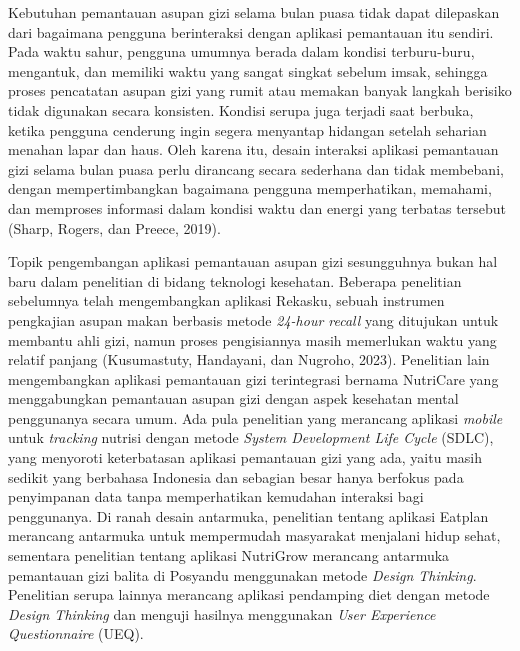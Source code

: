 Kebutuhan pemantauan asupan gizi selama bulan puasa tidak dapat dilepaskan dari bagaimana pengguna berinteraksi dengan aplikasi pemantauan itu sendiri. Pada waktu sahur, pengguna umumnya berada dalam kondisi terburu-buru, mengantuk, dan memiliki waktu yang sangat singkat sebelum imsak, sehingga proses pencatatan asupan gizi yang rumit atau memakan banyak langkah berisiko tidak digunakan secara konsisten. Kondisi serupa juga terjadi saat berbuka, ketika pengguna cenderung ingin segera menyantap hidangan setelah seharian menahan lapar dan haus. Oleh karena itu, desain interaksi aplikasi pemantauan gizi selama bulan puasa perlu dirancang secara sederhana dan tidak membebani, dengan mempertimbangkan bagaimana pengguna memperhatikan, memahami, dan memproses informasi dalam kondisi waktu dan energi yang terbatas tersebut (Sharp, Rogers, dan Preece, 2019).

Topik pengembangan aplikasi pemantauan asupan gizi sesungguhnya bukan hal baru dalam penelitian di bidang teknologi kesehatan. Beberapa penelitian sebelumnya telah mengembangkan aplikasi Rekasku, sebuah instrumen pengkajian asupan makan berbasis metode \emph{24-hour recall} yang ditujukan untuk membantu ahli gizi, namun proses pengisiannya masih memerlukan waktu yang relatif panjang (Kusumastuty, Handayani, dan Nugroho, 2023). Penelitian lain mengembangkan aplikasi pemantauan gizi terintegrasi bernama NutriCare yang menggabungkan pemantauan asupan gizi dengan aspek kesehatan mental penggunanya secara umum. Ada pula penelitian yang merancang aplikasi \emph{mobile} untuk \emph{tracking} nutrisi dengan metode \emph{System Development Life Cycle} (SDLC), yang menyoroti keterbatasan aplikasi pemantauan gizi yang ada, yaitu masih sedikit yang berbahasa Indonesia dan sebagian besar hanya berfokus pada penyimpanan data tanpa memperhatikan kemudahan interaksi bagi penggunanya. Di ranah desain antarmuka, penelitian tentang aplikasi Eatplan merancang antarmuka untuk mempermudah masyarakat menjalani hidup sehat, sementara penelitian tentang aplikasi NutriGrow merancang antarmuka pemantauan gizi balita di Posyandu menggunakan metode \emph{Design Thinking}. Penelitian serupa lainnya merancang aplikasi pendamping diet dengan metode \emph{Design Thinking} dan menguji hasilnya menggunakan \emph{User Experience Questionnaire} (UEQ).

